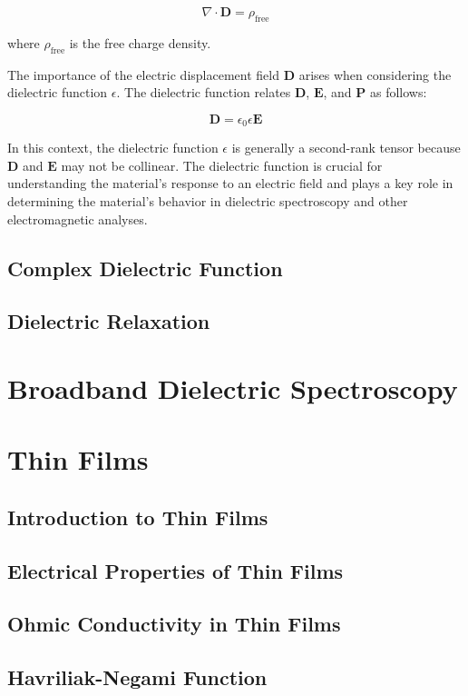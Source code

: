 \[
\nabla \cdot \mathbf{D} = \rho_{\text{free}}
\]

where \( \rho_{\text{free}} \) is the free charge density.

The importance of the electric displacement field \( \mathbf{D} \) arises when considering the dielectric function \( \epsilon \). The dielectric function relates \( \mathbf{D} \), \( \mathbf{E} \), and \( \mathbf{P} \) as follows:

\[
\mathbf{D} = \epsilon_0 \epsilon \mathbf{E}
\]

In this context, the dielectric function \( \epsilon \) is generally a second-rank tensor because \( \mathbf{D} \) and \( \mathbf{E} \) may not be collinear. The dielectric function is crucial for understanding the material's response to an electric field and plays a key role in determining the material's behavior in dielectric spectroscopy and other electromagnetic analyses.

\subsection{Complex Dielectric Function}
\subsection{Dielectric Relaxation}
\section{Broadband Dielectric Spectroscopy}
\section{Thin Films}
\subsection{Introduction to Thin Films}
\subsection{Electrical Properties of Thin Films}
\subsection{Ohmic Conductivity in Thin Films}
\subsection{Havriliak-Negami Function}

